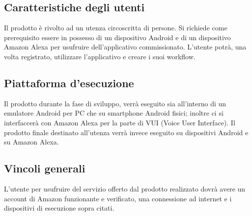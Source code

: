 \subsection{Caratteristiche degli utenti}
Il prodotto è rivolto ad un utenza circoscritta di persone. Si richiede come prerequisito essere in possesso di un dispositivo Android e di un dispositivo Amazon Alexa per usufruire dell'applicativo commissionato. L'utente potrà, una volta registrato, utilizzare l'applicativo e creare i suoi workflow.
\subsection{Piattaforma d'esecuzione}
Il prodotto durante la fase di sviluppo, verrà eseguito sia all'interno di un emulatore Android per PC che su smartphone Android fisici; inoltre ci si interfaccerà con Amazon Alexa per la parte di VUI (Voice User Interface).
Il prodotto finale destinato all'utenza verrà invece eseguito su dispositivi Android e su Amazon Alexa.
\subsection{Vincoli generali}
L'utente per usufruire del servizio offerto dal prodotto realizzato dovrà avere un account di Amazon funzionante e verificato, una connessione ad internet e i dispositivi di esecuzione sopra citati. 
